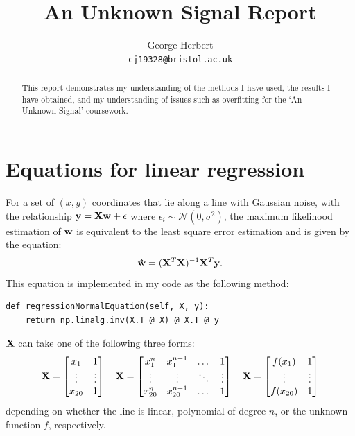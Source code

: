 \documentclass[onecolumn, 12pt, a4paper]{article}
\author{
  George Herbert\\
  \texttt{cj19328@bristol.ac.uk}
}
\title{An Unknown Signal Report}
\begin{document}
\maketitle

\begin{abstract}
    This report demonstrates my understanding of the methods I have 
    used, the results I have obtained, and my understanding
    of issues such as overfitting for the `An Unknown Signal'
    coursework.
\end{abstract}

\section{Equations for linear regression}

For a set of $(x, y)$ coordinates that lie along a line with Gaussian noise, 
with the relationship $\vb{y} = \vb{X}\vb{w} + \vb{\epsilon}$ where $\epsilon_{i} \sim \mathcal{N}(0, \sigma^{2})$,
the maximum likelihood estimation of $\vb{w}$ is equivalent to
the least square error estimation and is given by the equation:
\[
    \vb{\hat{w}} = (\vb{X}^{T}\vb{X})^{-1}\vb{X}^{T}\vb{y}.
\]
This equation is implemented in my code as the following
method:
\begin{verbatim}
def regressionNormalEquation(self, X, y):
    return np.linalg.inv(X.T @ X) @ X.T @ y
\end{verbatim}

$\vb{X}$ can take one of the following
three forms:
\[
\vb{X} =
\begin{bmatrix}
    x_{1} & 1 \\
    \vdots & \vdots \\
    x_{20} & 1 \\
\end{bmatrix}
\quad
\vb{X} =
\begin{bmatrix}
    x_{1}^{n} & x_{1}^{n-1} & \dots & 1 \\
    \vdots & \vdots & \ddots & \vdots \\
    x_{20}^{n} & x_{20}^{n-1} & \dots & 1 \\
\end{bmatrix}
\quad
\vb{X} =
\begin{bmatrix}
    f(x_{1}) & 1 \\
    \vdots & \vdots \\
    f(x_{20}) & 1 \\
\end{bmatrix}
\]
depending on whether the line is linear, polynomial of degree $n$,
or the unknown function $f$, respectively.
\end{document}
